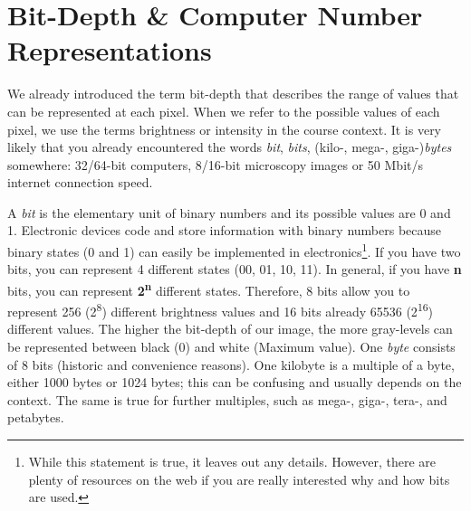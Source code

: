\newpage
\section{Bit-Depth \& Computer Number Representations}

We already introduced the term bit-depth that describes the range of values that can be represented at each pixel. When we refer to the possible values of each pixel, we use the terms brightness or intensity in the course context. It is very likely that you already encountered the words \emph{bit}, \emph{bits}, (kilo-, mega-, giga-)\emph{bytes} somewhere: 32/64-bit computers, 8/16-bit microscopy images or 50 Mbit/s internet connection speed.

A \emph{bit} is the elementary unit of binary numbers and its possible values are 0 and 1. Electronic devices code and store information with binary numbers because binary states (0 and 1) can easily be implemented in electronics\footnote{While this statement is true, it leaves out any details. However, there are plenty of resources on the web if you are really interested why and how bits are used.}. If you have two bits, you can represent 4 different states (00, 01, 10, 11). In general, if you have \textbf{n} bits, you can represent \textbf{2\textsuperscript{n}} different states. Therefore, 8 bits allow you to represent 256 (2\textsuperscript{8}) different brightness values and 16 bits already 65536 (2\textsuperscript{16}) different values. The higher the bit-depth of our image, the more gray-levels can be represented between black (0) and white (Maximum value). One \emph{byte} consists of 8 bits (historic and convenience reasons). One kilobyte is a multiple of a byte, either 1000 bytes or 1024 bytes; this can be confusing and usually depends on the context. The same is true for further multiples, such as mega-, giga-, tera-, and petabytes.

